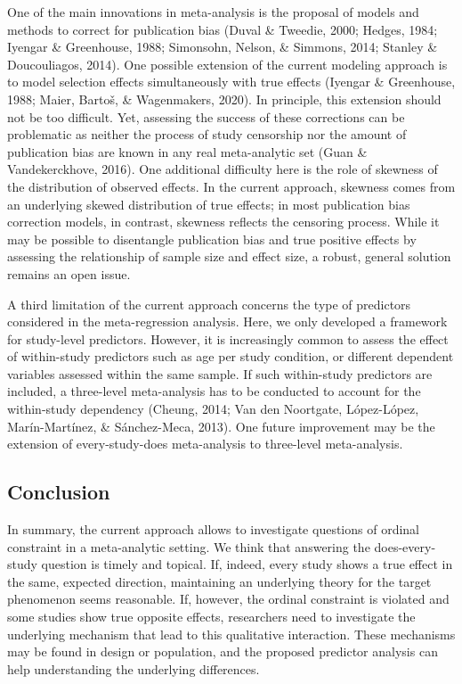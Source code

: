 \documentclass[english,,man]{apa6}
\begin{document}
One of the main innovations in meta-analysis is the proposal of models and methods to correct for publication bias (Duval \& Tweedie, 2000; Hedges, 1984; Iyengar \& Greenhouse, 1988; Simonsohn, Nelson, \& Simmons, 2014; Stanley \& Doucouliagos, 2014). One possible extension of the current modeling approach is to model selection effects simultaneously with true effects (Iyengar \& Greenhouse, 1988; Maier, Bartoš, \& Wagenmakers, 2020). In principle, this extension should not be too difficult. Yet, assessing the success of these corrections can be problematic as neither the process of study censorship nor the amount of publication bias are known in any real meta-analytic set (Guan \& Vandekerckhove, 2016). One additional difficulty here is the role of skewness of the distribution of observed effects. In the current approach, skewness comes from an underlying skewed distribution of true effects; in most publication bias correction models, in contrast, skewness reflects the censoring process. While it may be possible to disentangle publication bias and true positive effects by assessing the relationship of sample size and effect size, a robust, general solution remains an open issue.

A third limitation of the current approach concerns the type of predictors considered in the meta-regression analysis. Here, we only developed a framework for study-level predictors. However, it is increasingly common to assess the effect of within-study predictors such as age per study condition, or different dependent variables assessed within the same sample. If such within-study predictors are included, a three-level meta-analysis has to be conducted to account for the within-study dependency (Cheung, 2014; Van den Noortgate, López-López, Marín-Martínez, \& Sánchez-Meca, 2013). One future improvement may be the extension of every-study-does meta-analysis to three-level meta-analysis.

\hypertarget{conclusion}{%
\subsection{Conclusion}\label{conclusion}}

In summary, the current approach allows to investigate questions of ordinal constraint in a meta-analytic setting. We think that answering the does-every-study question is timely and topical. If, indeed, every study shows a true effect in the same, expected direction, maintaining an underlying theory for the target phenomenon seems reasonable. If, however, the ordinal constraint is violated and some studies show true opposite effects, researchers need to investigate the underlying mechanism that lead to this qualitative interaction. These mechanisms may be found in design or population, and the proposed predictor analysis can help understanding the underlying differences.
\end{document}
